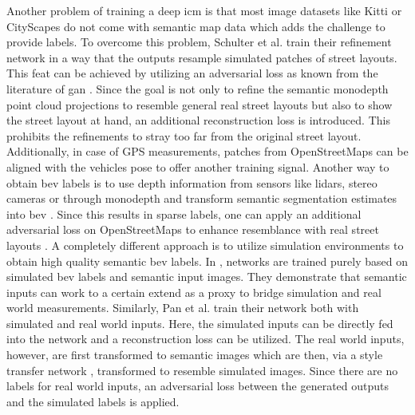 Another problem of training a deep \gls{icm} is that most image datasets like Kitti \cite{geiger2013vision} or CityScapes \cite{cordts2016cityscapes} do not come with semantic map data which adds the challenge to provide labels. To overcome this problem, Schulter et al. \cite{schulter2018learning} train their refinement network in a way that the outputs resample simulated patches of street layouts. This feat can be achieved by utilizing an adversarial loss as known from the literature of \gls{gan} \cite{goodfellow2020generative}. Since the goal is not only to refine the semantic monodepth point cloud projections to resemble general real street layouts but also to show the street layout at hand, an additional reconstruction loss is introduced. This prohibits the refinements to stray too far from the original street layout.
Additionally, in case of GPS measurements, patches from OpenStreetMaps \cite{haklay2008openstreetmap} can be aligned with the vehicles pose to offer another training signal. Another way to obtain \gls{bev} labels is to use depth information from sensors like lidars, stereo cameras or through monodepth and transform semantic segmentation estimates into \gls{bev} \cite{mani2020monolayout,lu2019monocular}. Since this results in sparse labels, one can apply an additional adversarial loss on OpenStreetMaps to enhance resemblance with real street layouts \cite{mani2020monolayout}. A completely different approach is to utilize simulation environments to obtain high quality semantic \gls{bev} labels. In \cite{reiher2020sim2real}, networks are trained purely based on simulated \gls{bev} labels and semantic input images. They demonstrate that semantic inputs can work to a certain extend as a proxy to bridge simulation and real world measurements. Similarly, Pan et al. \cite{pan2020cross} train their network both with simulated and real world inputs. Here, the simulated inputs can be directly fed into the network and a reconstruction loss can be utilized. The real world inputs, however, are first transformed to semantic images which are then, via a style transfer network \cite{jing2019neural}, transformed to resemble simulated images. Since there are no labels for real world inputs, an adversarial loss between the generated outputs and the simulated labels is applied.\\  
